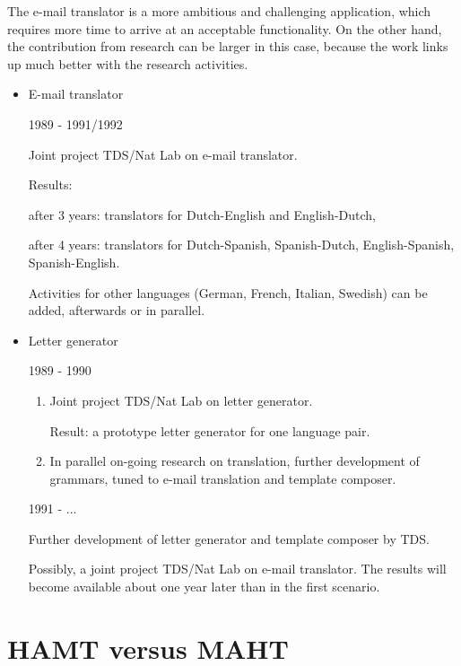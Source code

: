The e-mail translator is a more ambitious and challenging application, 
which requires more time to arrive at an acceptable
functionality.
On the other hand, the contribution from 
research can be larger in this case, because the work links
up much better with the research activities. 


\begin{itemize}


\item E-mail translator 


1989 - 1991/1992

Joint project TDS/Nat Lab on e-mail translator.

Results: 

after 3 years: translators for Dutch-English and English-Dutch,

after 4 years: translators for Dutch-Spanish, Spanish-Dutch, English-Spanish,
Spanish-English.

Activities for other languages (German, French, Italian, Swedish) can be added,
afterwards or in parallel. 

\item Letter generator 


1989 - 1990

\begin{enumerate}

\item Joint project TDS/Nat Lab on letter generator.

Result: a prototype letter generator for one language pair. 


\item In parallel on-going research
on translation, further development of grammars, tuned to e-mail 
translation and template composer. 

\end{enumerate}

1991 - ... 

Further development of letter generator and template composer by TDS.

Possibly, a joint project TDS/Nat Lab on e-mail translator.
The results will 
become available about one year later than in the first scenario.

\end{itemize}





\section{HAMT versus MAHT}



